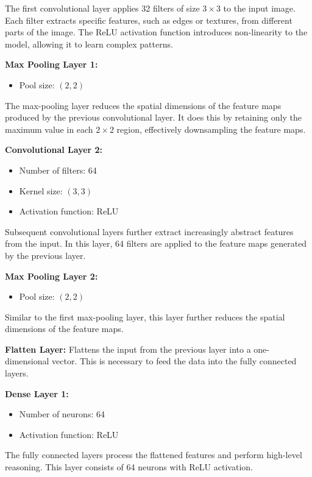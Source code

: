 \documentclass{article}
\begin{document}
The first convolutional layer applies 32 filters of size $3 \times 3$ to the input image. Each filter extracts specific features, such as edges or textures, from different parts of the image. The ReLU activation function introduces non-linearity to the model, allowing it to learn complex patterns.

\textbf{Max Pooling Layer 1:}
\begin{itemize}
    \item Pool size: $(2, 2)$
\end{itemize}

The max-pooling layer reduces the spatial dimensions of the feature maps produced by the previous convolutional layer. It does this by retaining only the maximum value in each $2 \times 2$ region, effectively downsampling the feature maps.

\textbf{Convolutional Layer 2:}
\begin{itemize}
    \item Number of filters: 64
    \item Kernel size: $(3, 3)$
    \item Activation function: ReLU
\end{itemize}

Subsequent convolutional layers further extract increasingly abstract features from the input. In this layer, 64 filters are applied to the feature maps generated by the previous layer.

\textbf{Max Pooling Layer 2:}
\begin{itemize}
    \item Pool size: $(2, 2)$
\end{itemize}

Similar to the first max-pooling layer, this layer further reduces the spatial dimensions of the feature maps.


\textbf{Flatten Layer:}
Flattens the input from the previous layer into a one-dimensional vector. This is necessary to feed the data into the fully connected layers.

\textbf{Dense Layer 1:}
\begin{itemize}
    \item Number of neurons: 64
    \item Activation function: ReLU
\end{itemize}

The fully connected layers process the flattened features and perform high-level reasoning. This layer consists of 64 neurons with ReLU activation.
\end{document}
